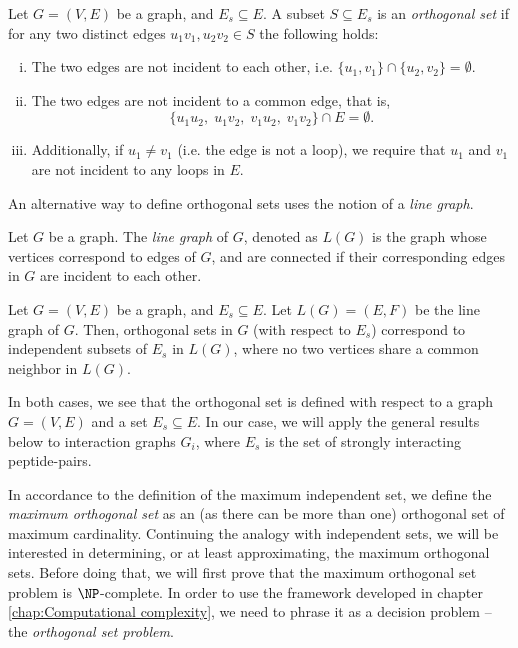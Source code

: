 \documentclass[12pt,a4paper,titlepage,openany]{report}
\begin{document}
\begin{definition}
	Let $G=(V, E)$ be a graph, and $E_s \subseteq E$. A subset $S \subseteq E_s$ is an \emph{orthogonal set} if for any two distinct edges $u_1v_1, u_2v_2 \in S$ the following holds:
	\begin{enumerate}[i)]
		\item The two edges are not incident to each other, i.e. $\{u_1,v_1\} \cap \{u_2, v_2\} = \emptyset.$
		\item The two edges are not incident to a common edge, that is, \[\{u_1u_2,\; u_1v_2,\; v_1u_2,\; v_1v_2\} \cap E = \emptyset.\]
		\item Additionally, if $u_1 \neq v_1$ (i.e. the edge is not a loop), we require that $u_1$ and $v_1$ are not incident to any loops in $E$. 
	\end{enumerate}
	\label{def:Orthogonal set}
\end{definition}

An alternative way to define orthogonal sets uses the notion of a \emph{line graph}.
\begin{definition}
	Let $G$ be a graph. The \emph{line graph} of $G$, denoted as $L(G)$ is the graph whose vertices correspond to edges of $G$, and are connected if their corresponding edges in $G$ are incident to each other.
\end{definition}

\begin{proposition}
	Let $G = (V, E)$ be a graph, and $E_s \subseteq E$. Let $L(G) = (E, F)$ be the line graph of $G$. Then, orthogonal sets in $G$ (with respect to $E_s$) correspond to independent subsets of $E_s$ in $L(G)$, where no two vertices share a common neighbor in $L(G)$.
\end{proposition}
In both cases, we see that the orthogonal set is defined with respect to a graph $G=(V, E)$ and a set $E_s \subseteq E$. In our case, we will apply the general results below to interaction graphs $G_i$, where $E_s$ is the set of strongly interacting peptide-pairs.

In accordance to the definition of the maximum independent set, we define the \emph{maximum orthogonal set} as an (as there can be more than one) orthogonal set of maximum cardinality. Continuing the analogy with independent sets, we will be interested in determining, or at least approximating, the maximum orthogonal sets. Before doing that, we will first prove that the maximum orthogonal set problem is $\NP$-complete. In order to use the framework developed in chapter \ref{chap:Computational complexity}, we need to phrase it as a decision problem -- the \emph{orthogonal set problem}.
\end{document}
